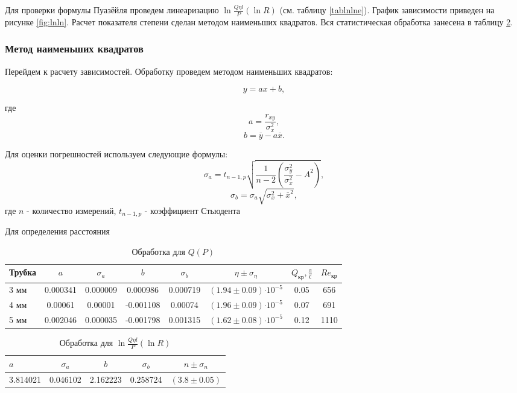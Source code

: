 \documentclass[12pt,a4paper]{article}
\newcommand{\e}[1]{\text{$\cdot10^{#1}$}}
\newcommand{\uf}[2]{\text{$\frac{\text{#1}}{\text{#2}}$}}
\begin{document}
Для проверки формулы Пуазёйля проведем линеаризацию $\ln{\frac{Q \eta l}{P}} (\ln{R})$ (см. таблицу \ref{tablnlne}). График зависимости приведен на рисунке \ref{fig:lnln}. Расчет показателя степени сделан методом наименьших квадратов. Вся статистическая обработка занесена в таблицу \ref{tablll}.

\subsubsection*{Метод наименьших квадратов}
Перейдем к расчету зависимостей. Обработку проведем методом наименьших квадратов:

$$y = ax + b,$$

где $$a = \frac{r_{xy}}{ \sigma_x^2},$$
$$b = \overline{y} - a\overline{x}.$$

Для оценки погрешностей используем следующие формулы:
$$\sigma_a =  t_{n-1, p} \sqrt{\frac{1}{n-2} \left( \frac{\sigma_y^2}{\sigma_x^2} - A^2 \right)},$$
$$\sigma_b = \sigma_a \sqrt{\sigma_x^2 + \overline{x}^2},$$
где 
$n$ - количество измерений, $ t_{n-1, p}$ - коэффициент Стьюдента

Для определения расстояния
\begin{table}[H]
	
	\caption{Обработка для $Q(P)$}
	\label{tab:ab}
	\centering
	\footnotesize
	\begin{tabular}{lccccccc}
		\toprule
		
		Трубка & $a$ & $\sigma_a$ & $b$ & $\sigma_b$ & $\eta \pm \sigma_{\eta}$ & $Q_{\text{кр}}, \uf{л}{с}$ & $Re_{\text{кр}}$\\
		\midrule
		3 мм & 0.000341  &  0.000009 & 0.000986    & 0.000719 & $(1.94\pm0.09)\e{-5}$ & 0.05 & 656\\ 
		4 мм & 0.00061   &  0.00001  & -0.001108   & 0.00074  & $(1.96\pm0.09)\e{-5}$ & 0.07 & 691\\ 
		5 мм & 0.002046  &  0.000035 & -0.001798   & 0.001315 & $(1.62\pm0.08)\e{-5}$ & 0.12 & 1110\\ 
		\bottomrule
	\end{tabular}
\end{table}

\begin{table}[H]
	
	\caption{Обработка для  $\ln{\frac{Q \eta l}{P}} (\ln{R})$}
	\label{tablll}
	\centering
	\footnotesize
	\begin{tabular}{lcccc}
		\toprule
		$a$ & $\sigma_a$ & $b$ & $\sigma_b$ & $n\pm\sigma_n$\\
		\midrule
		3.814021  &  0.046102 & 2.162223  &  0.258724 & $(3.8\pm 0.05)$ \\
		\bottomrule
	\end{tabular}
\end{table}
\end{document}
